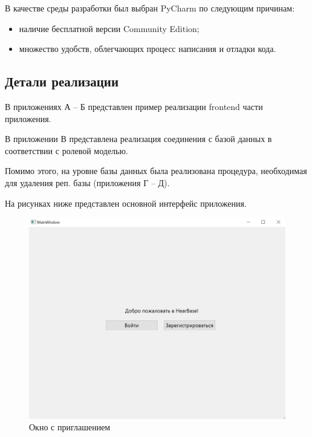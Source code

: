 В качестве среды разработки был выбран PyCharm по следующим причинам:
\begin{itemize}
	\item наличие бесплатной версии Community Edition;
	\item множество удобств, облегчающих процесс написания и отладки кода.
\end{itemize}

\subsection{Детали реализации}
В приложениях А -- Б представлен пример реализации frontend части приложения.

В приложении В представлена реализация соединения с базой данных в соответствии с ролевой моделью.

Помимо этого, на уровне базы данных была реализована процедура, необходимая для удаления реп. базы (приложения Г – Д).


На рисунках ниже представлен основной интерфейс приложения.

\begin{figure}[h!]
	\begin{center}
		\includegraphics[scale=1]{jpg/Welcome.jpg}
	\end{center}
	\captionsetup{justification=centering}
	\caption{Окно с приглашением}
\end{figure}

